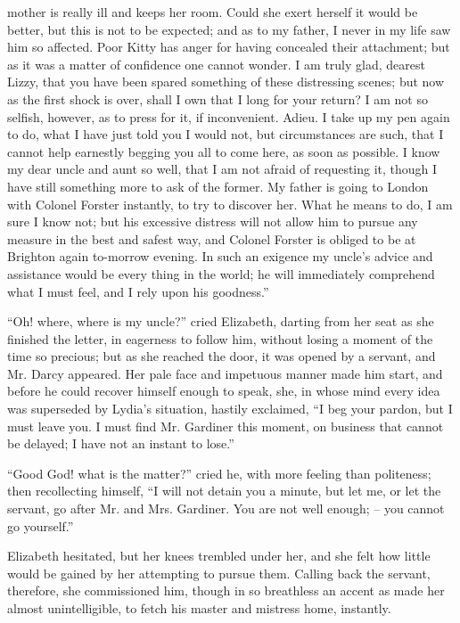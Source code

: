 mother is really ill and keeps her room. Could she exert
herself it would be better, but this is not to be expected;
and as to my father, I never in my life saw him so affected.
Poor Kitty has anger for having concealed their attachment;
but as it was a matter of confidence one cannot
wonder. I am truly glad, dearest Lizzy, that you have
been spared something of these distressing scenes; but
now as the first shock is over, shall I own that I long for
your return? I am not so selfish, however, as to press
for it, if inconvenient. Adieu. I take up my pen again
to do, what I have just told you I would not, but circumstances
are such, that I cannot help earnestly begging
you all to come here, as soon as possible. I know my dear
uncle and aunt so well, that I am not afraid of requesting
it, though I have still something more to ask of the former.
My father is going to London with Colonel Forster instantly,
to try to discover her. What he means to do,
I am sure I know not; but his excessive distress will not
allow him to pursue any measure in the best and safest
way, and Colonel Forster is obliged to be at Brighton
again to-morrow evening. In such an exigence my uncle’s
advice and assistance would be every thing in the world;
he will immediately comprehend what I must feel, and
I rely upon his goodness.”

“Oh! where, where is my uncle?” cried Elizabeth,
darting from her seat as she finished the letter, in eagerness
to follow him, without losing a moment of the time so
precious; but as she reached the door, it was opened by
a servant, and Mr. Darcy appeared. Her pale face and
impetuous manner made him start, and before he could
recover himself enough to speak, she, in whose mind every
idea was superseded by Lydia’s situation, hastily exclaimed,
“I beg your pardon, but I must leave you. I must find
Mr. Gardiner this moment, on business that cannot be
delayed; I have not an instant to lose.”

“Good God! what is the matter?” cried he, with
more feeling than politeness; then recollecting himself,
“I will not detain you a minute, but let me, or let the
servant, go after Mr. and Mrs. Gardiner. You are not well
enough; -- you cannot go yourself.”

Elizabeth hesitated, but her knees trembled under her,
and she felt how little would be gained by her attempting
to pursue them. Calling back the servant, therefore, she
commissioned him, though in so breathless an accent as
made her almost unintelligible, to fetch his master and
mistress home, instantly.

